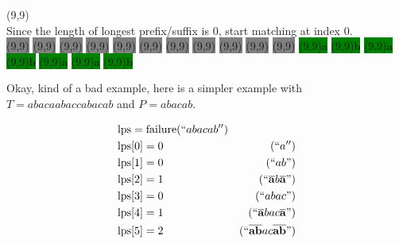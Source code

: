 \begin{center}
  \colorbox{white}{\makebox(9,9){\textcolor{black}{}}}
  \\
  Since the length of longest prefix/suffix is 0, start matching at index 0.
  \\
  \colorbox{gray}{\makebox(9,9){\textcolor{black}{}}}
  \colorbox{gray}{\makebox(9,9){\textcolor{black}{}}}
  \colorbox{gray}{\makebox(9,9){\textcolor{black}{}}}
  \colorbox{gray}{\makebox(9,9){\textcolor{black}{}}}
  \colorbox{gray}{\makebox(9,9){\textcolor{black}{}}}
  \colorbox{gray}{\makebox(9,9){\textcolor{black}{}}}
  \colorbox{gray}{\makebox(9,9){\textcolor{black}{}}}
  \colorbox{gray}{\makebox(9,9){\textcolor{black}{}}}
  \colorbox{gray}{\makebox(9,9){\textcolor{black}{}}}
  \colorbox{gray}{\makebox(9,9){\textcolor{black}{}}}
  \colorbox{gray}{\makebox(9,9){\textcolor{black}{}}}
  \colorbox{green}{\makebox(9,9){\textcolor{black}{a}}}
  \colorbox{green}{\makebox(9,9){\textcolor{black}{b}}}
  \colorbox{green}{\makebox(9,9){\textcolor{black}{a}}}
  \colorbox{green}{\makebox(9,9){\textcolor{black}{b}}}
  \colorbox{green}{\makebox(9,9){\textcolor{black}{a}}}
  \colorbox{green}{\makebox(9,9){\textcolor{black}{a}}}
  \colorbox{green}{\makebox(9,9){\textcolor{black}{b}}}
\end{center}

\noindent Okay, kind of a bad example, here is a simpler example with $T = abacaabaccabacab$ and $P = abacab$.

\begin{align*}
  &\mathrm{lps} = \mathrm{failure}(``abacab'') \\
  &\mathrm{lps}[0] = 0 & (``a'') \\
  &\mathrm{lps}[1] = 0 & (``ab") \\
  &\mathrm{lps}[2] = 1 & (``\mathbf{\overline{a}}b\mathbf{\overline{a}}") \\
  &\mathrm{lps}[3] = 0 & (``abac") \\
  &\mathrm{lps}[4] = 1 & (``\mathbf{\overline{a}}bac\mathbf{\overline{a}}") \\
  &\mathrm{lps}[5] = 2 & (``\mathbf{\overline{ab}}ac\mathbf{\overline{ab}}") \\
\end{align*}

